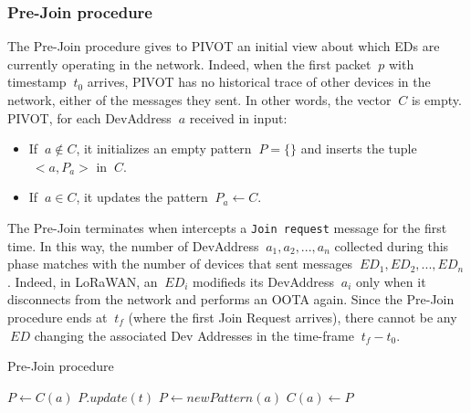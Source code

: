 \subsubsection{Pre-Join procedure}
The Pre-Join procedure gives to PIVOT an initial view about which EDs are currently operating in the network. Indeed, when the first packet \(\ p \) with timestamp \(\ t_{0} \) arrives, PIVOT has no historical trace of other devices in the network, either of the messages they sent. In other words, the vector \(\ C \) is empty.
\\
PIVOT, for each DevAddress \(\ a \) received in input:
\begin{itemize}
	\item If \(\ a \notin  C\), it initializes an empty pattern \(\ P = \{\} \) and inserts the tuple \(\ <a, P_{a} > \) in \(\ C \).
	\item If \(\ a \in C\), it updates the pattern \(\ P_{a} \gets C \).
\end{itemize}
The Pre-Join terminates when intercepts a \texttt{Join request} message for the first time. In this way, the number of DevAddress \(\ a_{1}, a_{2}, ..., a_{n} \) collected during this phase matches with the number of devices that sent messages \(\ ED_{1}, ED_{2}, ..., ED_{n} \). Indeed, in LoRaWAN, an \(\ ED_{i} \) modifieds its DevAddress \(\ a_{i} \) only when it disconnects from the network and performs an OOTA again. Since the Pre-Join procedure ends at \(\ t_{f} \) (where the first Join Request arrives), there cannot be any \(\ ED \) changing the associated Dev Addresses in the time-frame \(\ t_{f} - t_{0} \).

\begin{algorithm}
    \caption{Pre-Join procedure}
    \begin{algorithmic}[1]
            \State $P \gets C(a)$
            \State $P.update(t)$
        \Else
            \State $P \gets newPattern(a)$
            \State $C(a) \gets P$
        \EndIf
    \end{algorithmic}
\end{algorithm}

